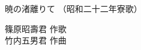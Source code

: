 \documentclass[10pt,b5j]{tarticle} %
\begin{document}
\begin{minipage}[c]{0.7\hsize} %
    \begin{center}
        {\LARGE
            暁の渚離りて %
        }
        {\small 
            （昭和二十二年寮歌） %
        }
    \end{center}
\end{minipage}
\begin{minipage}[c]{0.3\hsize} %
    \begin{flushright} %
        篠原昭壽君 作歌\\竹内五男君 作曲 %
    \end{flushright}
\end{minipage}
\end{document}
